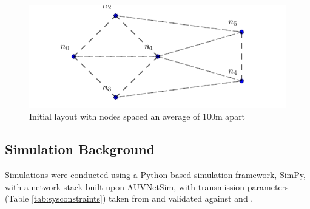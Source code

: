 \documentclass[conference]{IEEEtran}
\begin{document}
%
\begin{figure}[h]
  \centering
  \includegraphics[width=.45\textwidth]{img/s1_layout}
  \caption{Initial layout with nodes spaced an average of 100m apart}
  \label{fig:s1_layout}
\end{figure}
%

\subsection{Simulation Background}

Simulations were conducted using a Python based simulation framework, SimPy\cite{Mueller2003SimPy}, with a network stack built upon AUVNetSim\cite{Miquel2008}, with transmission parameters (Table \ref{tab:sysconstraints}) taken from and validated against \cite{Stojanovic2007} and \cite{Stefanov2011}.
\end{document}
